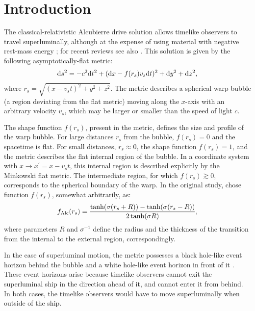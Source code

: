 \documentclass[10pt]{iopart}
\begin{document}
\section{Introduction}
\label{sec:Intro}


The classical-relativistic Alcubierre drive solution allows timelike observers to travel superluminally, although at the expense of using material with negative rest-mass energy \cite{Alcubierre1994}; for recent reviews see also \cite{Lobo2007,Alcubierre2017}. This solution is given by the following asymptotically-flat metric:
\begin{equation}
    {\rm d}s^2=-c^2 {\rm d} t^2 + ({\rm d}x-f(r_s)v_s {\rm d}t)^2+{\rm d}y^2 + {\rm d}z^2,
    \label{eq:Alc}
\end{equation}
where $r_s=\sqrt{(x-v_st)^2 + y^2 + z^2}$. The metric describes a spherical warp bubble (a region deviating from the flat metric) moving along the $x$-axis with an arbitrary velocity $v_s$, which may be larger or smaller than the speed of light $c$. 

The shape function $f(r_s)$, present in the metric, defines the size and profile of the warp bubble. For large distances $r_s$ from the bubble, $f(r_s)=0$ and the spacetime is flat. For small distances, $r_s\approx0$, the shape function $f(r_s) = 1$, and the metric describes the flat internal region of the bubble. In a coordinate system with $x\rightarrow x^\prime = x-v_st$, this internal region is described explicitly by the Minkowski flat metric. The intermediate region, for which $f(r_s)\gtrsim 0$, corresponds to the spherical boundary of the warp. In the original study, \cite{Alcubierre1994} chose function $f(r_s)$, somewhat arbitrarily, as:
\begin{equation}
\label{eq:ShFun0}
f_{\rm Alc} (r_s) = \frac{\tanh (\sigma (
r_s + R )) - \tanh (\sigma ( r_s - R ))}{2 \tanh( \sigma R)},
\end{equation}
where parameters $R$ and $\sigma^{-1}$ define the radius and the thickness of the transition from the internal to the external region, correspondingly.

In the case of superluminal motion, the metric possesses a black hole-like event horizon behind the bubble and a white hole-like event horizon in front of it \cite{Finazzi2009}. These event horizons arise because timelike observers cannot exit the superluminal ship in the direction ahead of it, and cannot enter it from behind. In both cases, the timelike observers would have to move superluminally when outside of the ship.
\end{document}
